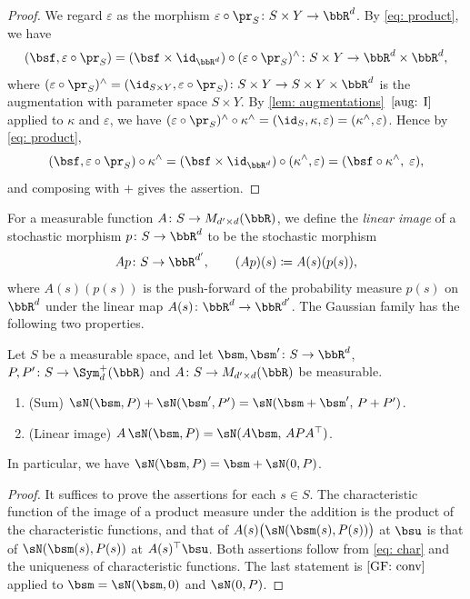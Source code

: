 \documentclass[12pt,reqno]{amsart}%
\theoremstyle{plain}
\theoremstyle{definition}
\def\R{\bbR}
\begin{document}
\begin{proof}
	We regard $\varepsilon$ as the morphism $\varepsilon\circ\pr_S\colon S\times Y\rightarrow\R^d$.
	By \eqref{eq: product}, we have 
	\[
		(\bsf,\varepsilon\circ\pr_S)=(\bsf\times\id_{\R^d})\circ(\varepsilon\circ\pr_S)^\wedge
		\colon S\times Y\rightarrow\R^d\times\R^d,
	\] 
	where 
	$(\varepsilon\circ\pr_S)^\wedge=(\id_{S\times Y},\varepsilon\circ\pr_S)\colon S\times Y\rightarrow S\times Y\times\R^d$ is the augmentation with parameter space 
	$S\times Y$. By \cref{lem: augmentations}~$\ref{aug: I}$ applied to $\kappa$ and $\varepsilon$, we have $(\varepsilon\circ\pr_S)^\wedge\circ\kappa^\wedge=(\id_S,\kappa,\varepsilon)=(\kappa^\wedge,\varepsilon)$. Hence by \eqref{eq: product},
	\[
		(\bsf,\varepsilon\circ\pr_S)\circ\kappa^\wedge=(\bsf\times\id_{\R^d})\circ(\kappa^\wedge,\varepsilon)=(\bsf\circ\kappa^\wedge,\;\varepsilon),
	\]
	and composing with ${+}$ gives the assertion.
\end{proof}


For a measurable function $A\colon S\rightarrow M_{d'\times d}(\R)$,
we define the \emph{linear image} of a stochastic morphism
$p\colon S\rightarrow\R^d$ to be the stochastic morphism
\[
	Ap\colon S\rightarrow\R^{d'},\qquad (Ap)(s)\coloneqq A(s)(p(s)),
\]
where $A(s)(p(s))$ is the push-forward of the probability measure $p(s)$ on $\R^d$
under the linear map $A(s)\colon\R^d\rightarrow\R^{d'}$.
The Gaussian family has the following two properties.

\begin{lemma}\label{lem: Gaussian family}
	Let $S$ be a measurable space, and let $\bsm,\bsm'\colon S\rightarrow\R^d$,
	$P,P'\colon S\rightarrow\Sym^+_d(\R)$
	and $A\colon S\rightarrow M_{d'\times d}(\R)$ be measurable.
	\begin{enumerate}[label=(\roman*)]
		\item\label{GF: conv} (Sum) $\sN(\bsm,P)+\sN(\bsm',P')=\sN(\bsm+\bsm',\,P+P')$.
		\item\label{GF: equiv} (Linear image) $A\,\sN(\bsm,P)=\sN(A\bsm,\,APA^{\top})$.
	\end{enumerate}
	In particular, we have $\sN(\bsm,P)=\bsm+\sN(0,P)$.
\end{lemma}

\begin{proof}
	It suffices to prove the assertions for each $s\in S$.
	The characteristic function of the image of a product measure under the addition is the product of the characteristic functions,
	and that of $A(s)\bigl(\sN(\bsm(s),P(s))\bigr)$ at $\bsu$ is that of $\sN(\bsm(s),P(s))$ at $A(s)^{\top}\bsu$.
	Both assertions follow from \eqref{eq: char} and the uniqueness of characteristic functions.
	The last statement is $\ref{GF: conv}$ applied to $\bsm=\sN(\bsm,0)$ and $\sN(0,P)$.
\end{proof}
\end{document}
